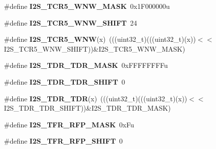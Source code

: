 \begin{DoxyCompactItemize}
\item 
\#define {\bfseries I2\+S\+\_\+\+T\+C\+R5\+\_\+\+W\+N\+W\+\_\+\+M\+A\+SK}~0x1\+F000000u\hypertarget{group__I2S__Register__Masks_gac7d0e32e2822b95984bd4c98097848e0}{}\label{group__I2S__Register__Masks_gac7d0e32e2822b95984bd4c98097848e0}

\item 
\#define {\bfseries I2\+S\+\_\+\+T\+C\+R5\+\_\+\+W\+N\+W\+\_\+\+S\+H\+I\+FT}~24\hypertarget{group__I2S__Register__Masks_ga76459cafce1757f4ea37a3fca81514a7}{}\label{group__I2S__Register__Masks_ga76459cafce1757f4ea37a3fca81514a7}

\item 
\#define {\bfseries I2\+S\+\_\+\+T\+C\+R5\+\_\+\+W\+NW}(x)~(((uint32\+\_\+t)(((uint32\+\_\+t)(x))$<$$<$I2\+S\+\_\+\+T\+C\+R5\+\_\+\+W\+N\+W\+\_\+\+S\+H\+I\+FT))\&I2\+S\+\_\+\+T\+C\+R5\+\_\+\+W\+N\+W\+\_\+\+M\+A\+SK)\hypertarget{group__I2S__Register__Masks_ga875934bf1e82a195cf9bd7414c9deac1}{}\label{group__I2S__Register__Masks_ga875934bf1e82a195cf9bd7414c9deac1}

\item 
\#define {\bfseries I2\+S\+\_\+\+T\+D\+R\+\_\+\+T\+D\+R\+\_\+\+M\+A\+SK}~0x\+F\+F\+F\+F\+F\+F\+F\+Fu\hypertarget{group__I2S__Register__Masks_gaa3e1fe9a61d8485d2d6968dfcf779502}{}\label{group__I2S__Register__Masks_gaa3e1fe9a61d8485d2d6968dfcf779502}

\item 
\#define {\bfseries I2\+S\+\_\+\+T\+D\+R\+\_\+\+T\+D\+R\+\_\+\+S\+H\+I\+FT}~0\hypertarget{group__I2S__Register__Masks_gacf46b25f4f14b34413430bc2071c1a13}{}\label{group__I2S__Register__Masks_gacf46b25f4f14b34413430bc2071c1a13}

\item 
\#define {\bfseries I2\+S\+\_\+\+T\+D\+R\+\_\+\+T\+DR}(x)~(((uint32\+\_\+t)(((uint32\+\_\+t)(x))$<$$<$I2\+S\+\_\+\+T\+D\+R\+\_\+\+T\+D\+R\+\_\+\+S\+H\+I\+FT))\&I2\+S\+\_\+\+T\+D\+R\+\_\+\+T\+D\+R\+\_\+\+M\+A\+SK)\hypertarget{group__I2S__Register__Masks_gabe6f8f2157a35e011d88193360f25f94}{}\label{group__I2S__Register__Masks_gabe6f8f2157a35e011d88193360f25f94}

\item 
\#define {\bfseries I2\+S\+\_\+\+T\+F\+R\+\_\+\+R\+F\+P\+\_\+\+M\+A\+SK}~0x\+Fu\hypertarget{group__I2S__Register__Masks_ga7c4e30b6d86edce6e8767f7800ef88a4}{}\label{group__I2S__Register__Masks_ga7c4e30b6d86edce6e8767f7800ef88a4}

\item 
\#define {\bfseries I2\+S\+\_\+\+T\+F\+R\+\_\+\+R\+F\+P\+\_\+\+S\+H\+I\+FT}~0\hypertarget{group__I2S__Register__Masks_ga9eee8668c1cef6c911103d45234930b3}{}\label{group__I2S__Register__Masks_ga9eee8668c1cef6c911103d45234930b3}


\end{DoxyCompactItemize}
